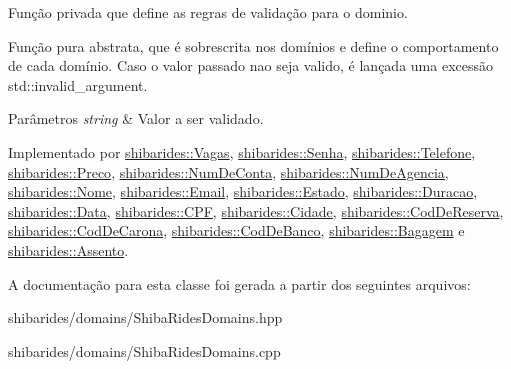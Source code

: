 Função privada que define as regras de validação para o dominio. 

Função pura abstrata, que é sobrescrita nos domínios e define o comportamento de cada domínio. Caso o valor passado nao seja valido, é lançada uma excessão std\+::invalid\+\_\+argument.


\begin{DoxyParams}{Parâmetros}
{\em string} & Valor a ser validado. \\
\hline
\end{DoxyParams}


Implementado por \hyperlink{classshibarides_1_1Vagas_ae5f73c52819397524b0334d9e609d296}{shibarides\+::\+Vagas}, \hyperlink{classshibarides_1_1Senha_a733550b46c79a95df9f5f4163f0be923}{shibarides\+::\+Senha}, \hyperlink{classshibarides_1_1Telefone_aa798f740a30faef8d2599950284ded33}{shibarides\+::\+Telefone}, \hyperlink{classshibarides_1_1Preco_ae57d286adf4db4b1132001f8736892f7}{shibarides\+::\+Preco}, \hyperlink{classshibarides_1_1NumDeConta_afe1c1bfd98ca97d59b521a6e7ac9d5ef}{shibarides\+::\+Num\+De\+Conta}, \hyperlink{classshibarides_1_1NumDeAgencia_a4bf7dd9204aff60838faf4f2362d8c3b}{shibarides\+::\+Num\+De\+Agencia}, \hyperlink{classshibarides_1_1Nome_aae6c1656422424a675e79a03a7ca534e}{shibarides\+::\+Nome}, \hyperlink{classshibarides_1_1Email_a0589d5dedd6e072f454391cd2e2873ee}{shibarides\+::\+Email}, \hyperlink{classshibarides_1_1Estado_a87dff745c1b1f487eae4bd4461e8a1ef}{shibarides\+::\+Estado}, \hyperlink{classshibarides_1_1Duracao_aa64196edbfe284120c3d498e20212a99}{shibarides\+::\+Duracao}, \hyperlink{classshibarides_1_1Data_a6240717eb60d01a7ab0c12336685c862}{shibarides\+::\+Data}, \hyperlink{classshibarides_1_1CPF_a0764894456e73dde8130a07f95b68f08}{shibarides\+::\+C\+PF}, \hyperlink{classshibarides_1_1Cidade_a2a2455d16a0d316ebcc57c4389e1a0b0}{shibarides\+::\+Cidade}, \hyperlink{classshibarides_1_1CodDeReserva_a595a667ca295b1adc5eedefd773d8027}{shibarides\+::\+Cod\+De\+Reserva}, \hyperlink{classshibarides_1_1CodDeCarona_a2713cdc938576b30a6f7e59ddc67a848}{shibarides\+::\+Cod\+De\+Carona}, \hyperlink{classshibarides_1_1CodDeBanco_a111bd50227f559d36010ddbf7bee1107}{shibarides\+::\+Cod\+De\+Banco}, \hyperlink{classshibarides_1_1Bagagem_aad85c0b035f3f3202130160edc35d41d}{shibarides\+::\+Bagagem} e \hyperlink{classshibarides_1_1Assento_a8a2099562808c49caff59569bcb977c3}{shibarides\+::\+Assento}.



A documentação para esta classe foi gerada a partir dos seguintes arquivos\+:\begin{DoxyCompactItemize}
\item 
shibarides/domains/Shiba\+Rides\+Domains.\+hpp\item 
shibarides/domains/Shiba\+Rides\+Domains.\+cpp\end{DoxyCompactItemize}
